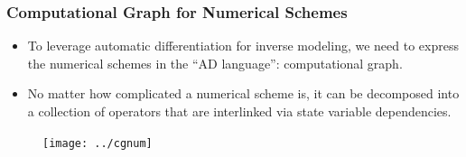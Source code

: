 \documentclass[usenames,dvipsnames]{beamer}
\begin{document}
\begin{frame}
	\frametitle{Computational Graph for Numerical Schemes}
	
	\begin{itemize}
		\item To leverage automatic differentiation for inverse modeling, we need to express the numerical schemes in the ``AD language'': computational graph. 
		\item No matter how complicated a numerical scheme is, it can be decomposed into a collection of operators that are interlinked via state variable dependencies. 
	\end{itemize}
	
	\begin{figure}[hbt]
  \texttt{[image: ../cgnum]}
\end{figure}

	
	
\end{frame}





\end{document}
